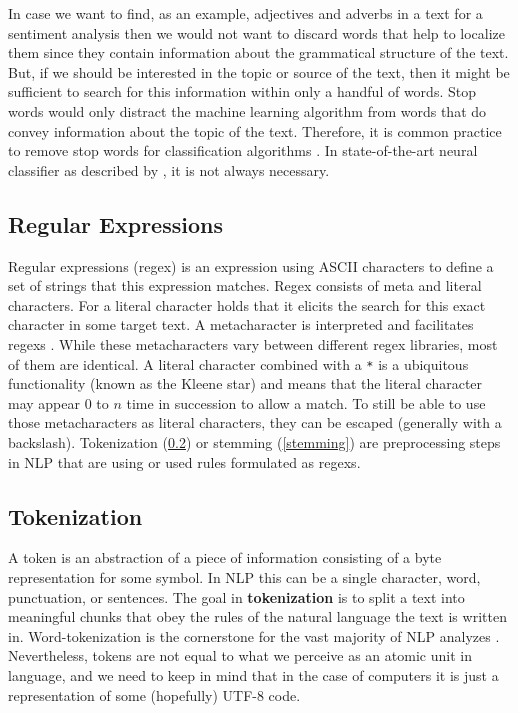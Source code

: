 In case we want to find, as an example,  adjectives and adverbs in a text for a sentiment analysis then we would not want to discard words that help to localize them since they contain information about the grammatical structure of the text.
But, if we should be interested in the topic or source of the text, then it might be sufficient to search for this information within only a handful of words.
Stop words would only distract the machine learning algorithm from words that do convey information about the topic of the text.
Therefore, it is common practice to remove stop words for classification algorithms \citep{McCallum1998, Lodhi2002, Tong2001}.
In state-of-the-art neural classifier as described by \cite{Howard2018}, it is not always necessary.

\subsection{Regular Expressions}
Regular expressions (\gls{regex}) is an expression using ASCII characters to define a set of strings that this expression matches.
Regex consists of meta and literal characters.
For a literal character holds that it elicits the search for this exact character in some target text.
A metacharacter is interpreted and facilitates regexs \citep{Kleene1951}.
While these metacharacters vary between different regex libraries, most of them are identical.
A literal character combined with a \texttt{*} is a ubiquitous functionality (known as the Kleene star) and means that the literal character may appear $0$ to $n$ time in succession to allow a match.
To still be able to use those metacharacters as literal characters, they can be escaped (generally with a backslash).
Tokenization (\ref{tokenization}) or stemming (\ref{stemming}) are preprocessing steps in NLP that are using or used rules formulated as regexs.

\subsection{Tokenization}\label{tokenization}
A token is an abstraction of a piece of information consisting of a byte representation for some symbol.
In NLP this can be a single character, word, punctuation, or sentences.
The goal in \textbf{tokenization} is to split a text into meaningful chunks that obey the rules of the natural language the text is written in.
Word-tokenization is the cornerstone for the vast majority of NLP analyzes \citep{Webster1992}.
Nevertheless, tokens are not equal to what we perceive as an atomic unit in language, and we need to keep in mind that in the case of computers it is just a representation of some (hopefully) UTF-8 code.

